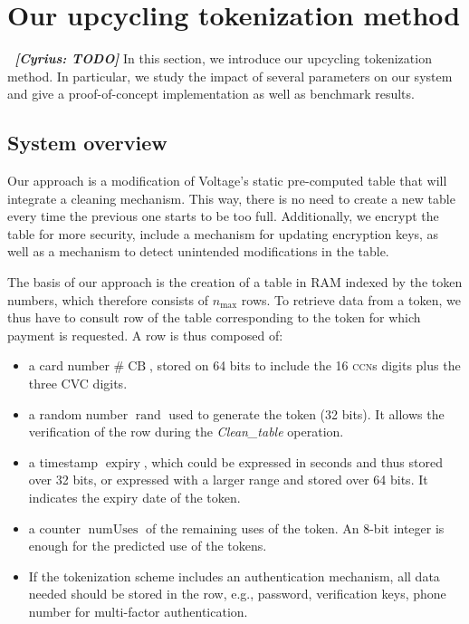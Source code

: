 \documentclass{llncs}
\DeclareMathOperator{\numUses}{numUses}
\DeclareMathOperator{\CB}{CB}
\DeclareMathOperator{\expiry}{expiry}
\DeclareMathOperator{\rand}{rand}
\newcommand{\cn}[1]{\emph{\bf \color{purple}~[Cyrius: #1]}}
\begin{document}
\section{Our upcycling tokenization method}\label{sect:method}

\cn{TODO}
In this section, we introduce our upcycling tokenization method. In particular, we study the impact of several parameters on our system and give a proof-of-concept implementation as well as benchmark results.

\subsection{System overview}

Our approach is a modification of Voltage's static pre-computed table that will integrate a cleaning mechanism. This way, there is no need to create a new table every time the previous one starts to be too full. Additionally, we encrypt the table for more security, include a mechanism for updating encryption keys, as well as a mechanism to detect unintended modifications in the table.

The basis of our approach is the creation of a table in RAM indexed by the token numbers, which therefore consists of $n_{\max}$ rows. To retrieve data from a token, we thus have to consult row of the table corresponding to the token for which payment is requested. A row is thus composed of:
\begin{itemize}
    \item a card number $\#\CB$, stored on 64 bits to include the 16 \textsc{ccn}s digits plus the three \textsc{CVC} digits.
    \item a random number $\rand$ used to generate the token (32 bits). It allows the verification of the row during the \textit{Clean\_table} operation.
    \item a timestamp $\expiry$, which could be expressed in seconds and thus stored over 32 bits, or expressed with a larger range and stored over 64 bits. It indicates the expiry date of the token.
    \item a counter $\numUses$ of the remaining uses of the token. An 8-bit integer is enough for the predicted use of the tokens.
    \item If the tokenization scheme includes an authentication mechanism, all data needed should be stored in the row, e.g., password, verification keys, phone number for multi-factor authentication.
\end{itemize}
\end{document}
